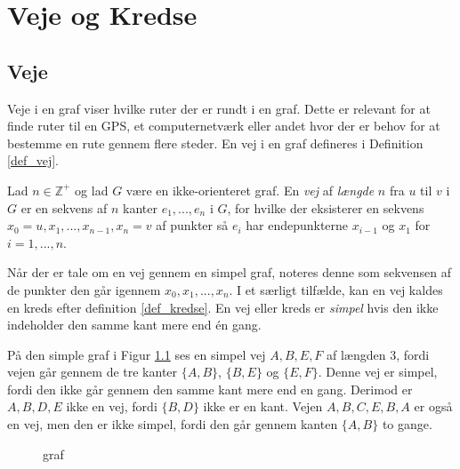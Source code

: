 \chapter{Veje og Kredse}



\section{Veje}
Veje i en graf viser hvilke ruter der er rundt i en graf. Dette er relevant for at finde ruter til en GPS, et computernetværk eller andet hvor der er behov for at bestemme en rute gennem flere steder. 
En vej i en graf defineres i Definition \ref{def_vej}.

\begin{defn}
\label{def_vej}
Lad $n \in  \mathbb{Z}^{+}$ og lad $G$ være en ikke-orienteret graf. 
En \textit{vej} af \textit{længde} $n$ fra $u$ til $v$ i $G$ er en sekvens af $n$ kanter $e_1, ..., e_n$ i $G$, for hvilke der eksisterer en sekvens $x_0=u,x_1,...,x_{n-1},x_n=v$ af punkter så $e_i$ har endepunkterne $x_{i-1}$ og $x_1$ for $i=1,...,n$.
\end{defn}

\noindent Når der er tale om en vej gennem en simpel graf, noteres denne som sekvensen af de punkter den går igennem $x_0, x_1,...,x_n$. 
I et særligt tilfælde, kan en vej kaldes en kreds efter definition \ref{def_kredse}.
En vej eller kreds er \textit{simpel} hvis den ikke indeholder den samme kant mere end én gang. 

\begin{exmp}
\label{ex_vej}
På den simple graf i Figur \ref{graf_vej} ses en simpel vej $A,B,E,F$ af længden 3, fordi vejen går gennem de tre kanter $\lbrace A,B \rbrace$, $\lbrace B,E \rbrace$ og $\lbrace E,F \rbrace$. 
Denne vej er simpel, fordi den ikke går gennem den samme kant mere end en gang. 
Derimod er $A,B,D,E$ ikke en vej, fordi $\lbrace B,D \rbrace$ ikke er en kant. 
Vejen $A,B,C,E,B,A$ er også en vej, men den er ikke simpel, fordi den går gennem kanten $\lbrace A,B \rbrace$ to gange. 

\end{exmp}

\begin{figure}[h]
\centering
{}
\caption{graf} 
\label{graf_vej}
\end{figure}


